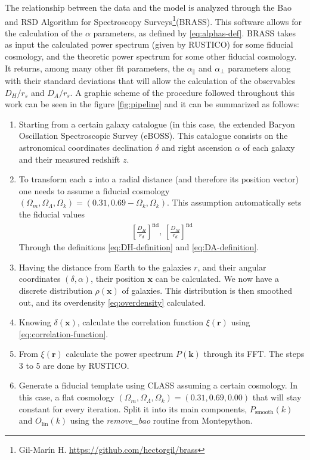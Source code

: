 The relationship between the data and the model is analyzed through the Bao and RSD Algorithm for Spectroscopy Surveys\footnote{Gil-Marín H. \url{https://github.com/hectorgil/brass}}(BRASS). This software allows for the calculation of the $\alpha$ parameters, as defined by \eqref{eq:alphas-def}. BRASS takes as input the calculated power spectrum (given by RUSTICO) for some  fiducial cosmology, and the theoretic power spectrum for some other fiducial cosmology. It returns, among many other fit parameters, the $\alpha_\parallel$ and $\alpha_\perp$ parameters along with their standard deviations that will allow the calculation of the observables $D_H/r_s$ and $D_A /r_s$. A graphic scheme of the procedure followed throughout this work can be seen in the figure \ref{fig:pipeline} and it can be summarized as follows:
\begin{enumerate}
	\item Starting from a certain galaxy catalogue (in this case, the extended Baryon Oscillation Spectroscopic Survey (eBOSS). This catalogue consists on the astronomical coordinates declination $\delta$ and right ascension $\alpha$ of each galaxy and their measured redshift $z$.
	\item To transform each $z$ into a radial distance (and therefore its position vector) one needs to assume a fiducial cosmology $(\Omega_m, \Omega_\Lambda, \Omega_k) = (0.31, 0.69-\Omega_k, \Omega_k) $. This assumption automatically sets the fiducial values 
	\begin{align}
		\left[ \frac{D_H}{r_d} \right] ^\text{fid}, \,\left[ \frac{D_M}{r_d} \right] ^\text{fid}
	\end{align}
	Through the definitions \eqref{eq:DH-definition} and \eqref{eq:DA-definition}.
\item Having the distance from Earth to the galaxies $r$, and their angular coordinates $(\delta, \alpha)$, their position $\textbf{x}$ can be calculated. We now have a discrete distribution $\rho(\textbf{x})$ of galaxies. This distribution is then smoothed out, and its overdensity \eqref{eq:overdensity} calculated.
\item Knowing $\delta(\textbf{x})$, calculate the correlation function $\xi(\textbf{r})$ using \eqref{eq:correlation-function}.
\item From $\xi(\textbf{r})$ calculate the power spectrum $P(\textbf{k})$ through its FFT. The steps 3 to 5 are done by RUSTICO.
\item Generate a fiducial template using CLASS assuming a certain cosmology. In this case, a flat cosmology $(\Omega_m, \Omega_\Lambda, \Omega_k) = (0.31, 0.69, 0.00)$ that will stay constant for every iteration. Split it into its main components,  $P_{\text{smooth}}(k)$ and $O_{\text{lin}}(k)$ using the \textit{remove\_bao} routine from Montepython.

\end{enumerate}
